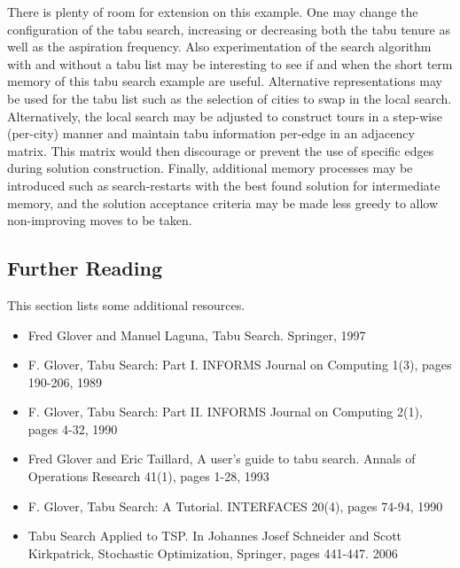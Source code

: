 There is plenty of room for extension on this example. One may change the configuration of the tabu search, increasing or decreasing both the tabu tenure as well as the aspiration frequency. Also experimentation of the search algorithm with and without a tabu list may be interesting to see if and when the short term memory of this tabu search example are useful. Alternative representations may be used for the tabu list such as the selection of cities to swap in the local search. Alternatively, the local search may be adjusted to construct tours in a step-wise (per-city) manner and maintain tabu information per-edge in an adjacency matrix. This matrix would then discourage or prevent the use of specific edges during solution construction. Finally, additional memory processes may be introduced such as search-restarts with the best found solution for intermediate memory, and the solution acceptance criteria may be made less greedy to allow non-improving moves to be taken.

\subsection{Further Reading}
This section lists some additional resources.

\begin{itemize}
	\item Fred Glover and Manuel Laguna, Tabu Search. Springer, 1997
	\item F. Glover, Tabu Search: Part I. INFORMS Journal on Computing 1(3), pages 190-206, 1989
	\item F. Glover, Tabu Search: Part II. INFORMS Journal on Computing 2(1), pages 4-32, 1990
	\item Fred Glover and Eric Taillard, A user's guide to tabu search. Annals of Operations Research 41(1), pages 1-28, 1993
	\item F. Glover, Tabu Search: A Tutorial. INTERFACES 20(4), pages 74-94, 1990
	\item Tabu Search Applied to TSP. In Johannes Josef Schneider and Scott Kirkpatrick, Stochastic Optimization, Springer, pages 441-447. 2006
\end{itemize}